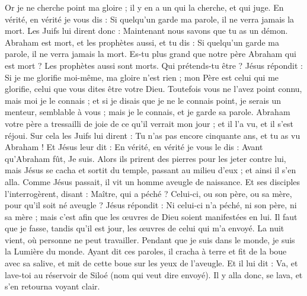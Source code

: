 \begin{multicols}{2}
Or je ne cherche point ma gloire ; il y en a un qui la cherche, et qui juge.
En vérité, en vérité je vous dis : Si quelqu'un garde ma parole, il ne verra jamais la mort.
Les Juifs lui dirent donc : Maintenant nous savons que tu as un démon. Abraham est mort, et les prophètes aussi, et tu dis : Si quelqu'un garde ma parole, il ne verra jamais la mort.
Es-tu plus grand que notre père Abraham qui est mort ? Les prophètes aussi sont morts. Qui prétends-tu être ?
Jésus répondit : Si je me glorifie moi-même, ma gloire n'est rien ; mon Père est celui qui me glorifie, celui que vous dites être votre Dieu.
Toutefois vous ne l'avez point connu, mais moi je le connais ; et si je disais que je ne le connais point, je serais un menteur, semblable à vous ; mais je le connais, et je garde sa parole.
Abraham votre père a tressailli de joie de ce qu'il verrait mon jour ; et il l'a vu, et il s'est réjoui.
Sur cela les Juifs lui dirent : Tu n'as pas encore cinquante ans, et tu as vu Abraham !
Et Jésus leur dit : En vérité, en vérité je vous le dis : Avant qu'Abraham fût, Je suis.
Alors ils prirent des pierres pour les jeter contre lui, mais Jésus se cacha et sortit du temple, passant au milieu d'eux ; et ainsi il s'en alla.
\VerseOne{}Comme Jésus passait, il vit un homme aveugle de naissance.
Et ses disciples l'interrogèrent, disant : Maître, qui a péché ? Celui-ci, ou son père, ou sa mère, pour qu'il soit né aveugle ?
Jésus répondit : Ni celui-ci n'a péché, ni son père, ni sa mère ; mais c'est afin que les œuvres de Dieu soient manifestées en lui.
Il faut que je fasse, tandis qu'il est jour, les œuvres de celui qui m'a envoyé. La nuit vient, où personne ne peut travailler.
Pendant que je suis dans le monde, je suis la Lumière du monde.
Ayant dit ces paroles, il cracha à terre et fit de la boue avec sa salive, et mit de cette boue sur les yeux de l'aveugle.
Et il lui dit : Va, et lave-toi au réservoir de Siloé (nom qui veut dire envoyé). Il y alla donc, se lava, et s'en retourna voyant clair.

\end{multicols}

